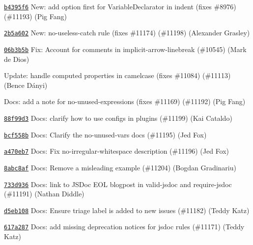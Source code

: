 \begin{DoxyItemize}
\item \href{https://github.com/eslint/eslint/commit/b4395f671442a7e0be956382c24cce38025a6df6}{\texttt{ {\ttfamily b4395f6}}} New\+: add option {\ttfamily first} for Variable\+Declarator in indent (fixes \#8976) (\#11193) (Pig Fang)
\item \href{https://github.com/eslint/eslint/commit/2b5a60284670a3ab1281b206941ed38faf2ea10c}{\texttt{ {\ttfamily 2b5a602}}} New\+: no-\/useless-\/catch rule (fixes \#11174) (\#11198) (Alexander Grasley)
\item \href{https://github.com/eslint/eslint/commit/06b3b5bfcf0429c5078d4f4af3c03bb777e4f022}{\texttt{ {\ttfamily 06b3b5b}}} Fix\+: Account for comments in implicit-\/arrow-\/linebreak (\#10545) (Mark de Dios)
\item \href{https://github.com/eslint/eslint/commit/4242314215a6f35e432860433906f47af1a29724}{\texttt{ {}}} Update\+: handle computed properties in camelcase (fixes \#11084) (\#11113) (Bence Dányi)
\item \href{https://github.com/eslint/eslint/commit/100930493d9ab802a94dac5c761515b12241ddd2}{\texttt{ {}}} Docs\+: add a note for no-\/unused-\/expressions (fixes \#11169) (\#11192) (Pig Fang)
\item \href{https://github.com/eslint/eslint/commit/88f99d31b88a4cde4563bc4a6f4c41f0cc557885}{\texttt{ {\ttfamily 88f99d3}}} Docs\+: clarify how to use configs in plugins (\#11199) (Kai Cataldo)
\item \href{https://github.com/eslint/eslint/commit/bcf558b2f7036f487af2bdb2b2d34b6cdf7fc174}{\texttt{ {\ttfamily bcf558b}}} Docs\+: Clarify the no-\/unused-\/vars docs (\#11195) (Jed Fox)
\item \href{https://github.com/eslint/eslint/commit/a470eb73d52fae0f0bc48de5a487e23cf78fcfa9}{\texttt{ {\ttfamily a470eb7}}} Docs\+: Fix no-\/irregular-\/whitespace description (\#11196) (Jed Fox)
\item \href{https://github.com/eslint/eslint/commit/8abc8afe71691b747cbd1819a13d896e8aa5b92a}{\texttt{ {\ttfamily 8abc8af}}} Docs\+: Remove a misleading example (\#11204) (Bogdan Gradinariu)
\item \href{https://github.com/eslint/eslint/commit/733d93618a99758a05453ab94505a9f1330950e0}{\texttt{ {\ttfamily 733d936}}} Docs\+: link to JSDoc EOL blogpost in valid-\/jsdoc and require-\/jsdoc (\#11191) (Nathan Diddle)
\item \href{https://github.com/eslint/eslint/commit/d5eb108e17f676d0e4fcddeb1211b4bdfac760c1}{\texttt{ {\ttfamily d5eb108}}} Docs\+: Ensure {\ttfamily triage} label is added to new issues (\#11182) (Teddy Katz)
\item \href{https://github.com/eslint/eslint/commit/617a2874ed085bca36ca289aac55e3b7f7ce937e}{\texttt{ {\ttfamily 617a287}}} Docs\+: add missing deprecation notices for jsdoc rules (\#11171) (Teddy Katz)
\end{DoxyItemize}

